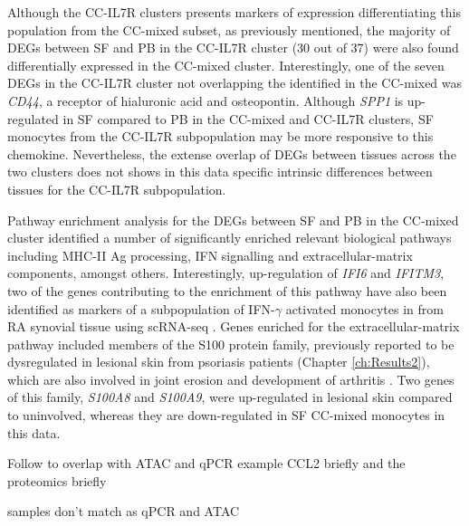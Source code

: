 Although the CC-IL7R clusters presents markers of expression differentiating this population from the CC-mixed subset, as previously mentioned, the majority of DEGs between SF and PB in the CC-IL7R cluster (30 out of 37) were also found differentially expressed in the CC-mixed cluster. Interestingly, one of the seven DEGs in the CC-IL7R cluster not overlapping the identified in the CC-mixed was \textit{CD44}, a receptor of hialuronic acid and osteopontin. Although \textit{SPP1} is up-regulated in SF compared to PB  in the CC-mixed and CC-IL7R clusters, SF monocytes from the CC-IL7R subpopulation may be more responsive to this chemokine. Nevertheless, the extense overlap of DEGs between tissues across the two clusters does not shows in this data specific intrinsic differences between tissues for the CC-IL7R subpopulation. %

Pathway enrichment analysis for the DEGs between SF and PB in the CC-mixed cluster identified a number of significantly enriched relevant biological pathways including MHC-II Ag processing, IFN signalling and extracellular-matrix components, amongst others. Interestingly, up-regulation of \textit{IFI6} and \textit{IFITM3}, two of the genes contributing to the enrichment of this pathway have also been identified as markers of a subpopulation of IFN-$\gamma$ activated monocytes in from RA synovial tissue using scRNA-seq \parencite{Zhang2018}. Genes enriched for the extracellular-matrix pathway included members of the S100 protein family, previously reported to be dysregulated in lesional skin from psoriasis patients (Chapter \ref{ch:Results2}), which are also involved in joint erosion and development of arthritis \parencite{Raghunatha2012}. Two genes of this family, \textit{S100A8} and \textit{S100A9}, were up-regulated in lesional skin compared to uninvolved, whereas they are down-regulated in SF CC-mixed monocytes in this data.




Follow to overlap with ATAC and qPCR example CCL2 briefly and the proteomics briefly


samples don't match as qPCR and ATAC


